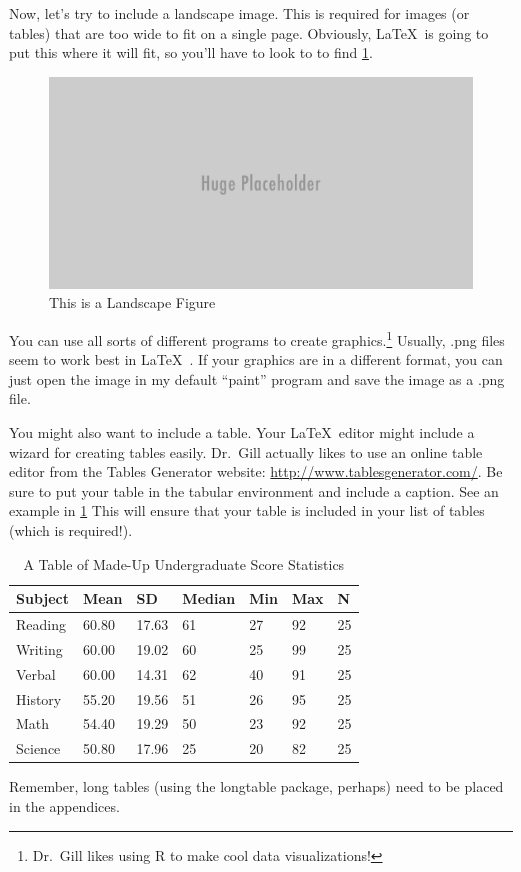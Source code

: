 Now, let's try to include a landscape image. This is required for images (or tables) that are too wide to fit on a single page. Obviously, \LaTeX\ is going to put this where it will fit, so you'll have to look to  to find \cref{fig:fig2}.

\begin{figure}
	\begin{center}
		\includegraphics[scale = .5]{huge-placeholder.png}
\end{center}
\caption{\label{fig:fig2}This is a Landscape Figure}
\end{figure}

You can use all sorts of different programs to create graphics.\footnote{Dr.\ Gill likes using \textsf{R} to make cool data visualizations!} Usually, .png files seem to work best in \LaTeX\ . If your graphics are in a different format, you can just open the image in my default ``paint'' program and save the image as a .png file. 

You might also want to include a table. Your \LaTeX\ editor might include a wizard for creating tables easily. Dr.\ Gill actually likes to use an online table editor from the Tables Generator website: \url{http://www.tablesgenerator.com/}. Be sure to put your table in the tabular environment and include a caption. See an example in \cref{sampletable} This will ensure that your table is included in your list of tables (which is required!). 

\begin{table}[htbp]
\centering
\caption{A Table of Made-Up Undergraduate Score Statistics}
\label{sampletable}
\begin{tabular}{lllllll} \toprule
Subject & Mean  & SD    & Median & Min & Max & N  \\ \midrule
Reading & 60.80 & 17.63 & 61     & 27  & 92  & 25 \\
Writing & 60.00 & 19.02 & 60     & 25  & 99  & 25 \\
Verbal  & 60.00 & 14.31 & 62     & 40  & 91  & 25 \\
History & 55.20 & 19.56 & 51     & 26  & 95  & 25 \\
Math    & 54.40 & 19.29 & 50     & 23  & 92  & 25 \\
Science & 50.80 & 17.96 & 25     & 20  & 82  & 25 \\
\bottomrule
\end{tabular}
\end{table}

Remember, long tables (using the \textsf{longtable} package, perhaps) need to be placed in the appendices. 
